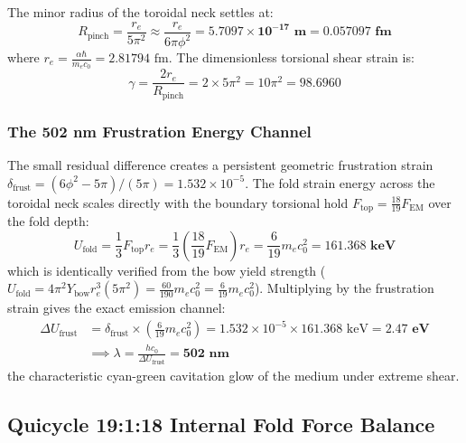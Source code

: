 \documentclass[11pt,a4paper]{article}
\begin{document}
The minor radius of the toroidal neck settles at:
\begin{equation}
\boxed{R_{\text{pinch}} = \frac{r_e}{5\pi^2} \approx \frac{r_e}{6\pi \phi^2} = \mathbf{5.7097 \times 10^{-17}\text{ m}} = \mathbf{0.057097\text{ fm}}}
\end{equation}
where $r_e = \frac{\alpha\hbar}{m_e c_0} = 2.81794\text{ fm}$. The dimensionless torsional shear strain is:
\begin{equation}
\boxed{\gamma = \frac{2 r_e}{R_{\text{pinch}}} = 2 \times 5\pi^2 = 10\pi^2 = \mathbf{98.6960}}
\end{equation}

\subsubsection{The 502 nm Frustration Energy Channel}
\label{subsubsec:frustration_channel}

The small residual difference creates a persistent geometric frustration strain $\delta_{\text{frust}} = (6\phi^2 - 5\pi)/(5\pi) = 1.532 \times 10^{-5}$. The fold strain energy across the toroidal neck scales directly with the boundary torsional hold $F_{\text{top}} = \frac{18}{19}F_{\text{EM}}$ over the fold depth:
\begin{equation}
U_{\text{fold}} = \frac{1}{3} F_{\text{top}} r_e = \frac{1}{3}\left(\frac{18}{19} F_{\text{EM}}\right) r_e = \frac{6}{19} m_e c_0^2 = \mathbf{161.368\text{ keV}}
\end{equation}
which is identically verified from the bow yield strength ($U_{\text{fold}} = 4\pi^2 Y_{\text{bow}} r_e^3 (5\pi^2) = \frac{60}{190} m_e c_0^2 = \frac{6}{19} m_e c_0^2$). Multiplying by the frustration strain gives the exact emission channel:
\begin{equation}
\begin{aligned}
\Delta U_{\text{frust}} &= \delta_{\text{frust}} \times \left(\frac{6}{19} m_e c_0^2\right) = 1.532 \times 10^{-5} \times 161.368\text{ keV} = \mathbf{2.47\text{ eV}} \\
&\implies \lambda = \frac{h c_0}{\Delta U_{\text{frust}}} = \mathbf{502\text{ nm}}
\end{aligned}
\end{equation}
the characteristic cyan-green cavitation glow of the medium under extreme shear.

\subsection{Quicycle 19:1:18 Internal Fold Force Balance}
\label{subsec:force_balance}
\end{document}
